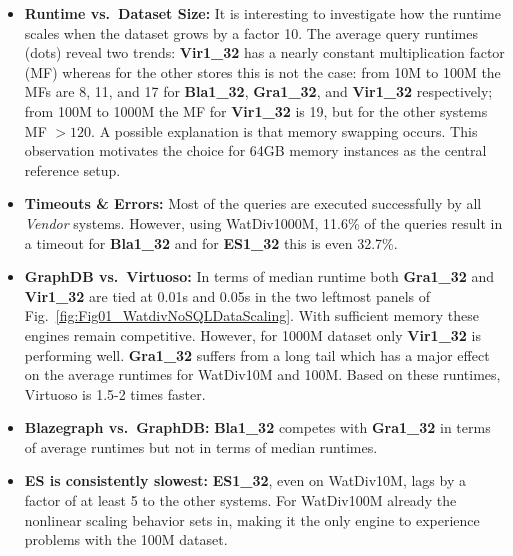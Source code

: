 \begin{itemize}
	\item \textbf{Runtime vs.\ Dataset Size:} It is interesting to investigate how the runtime scales when the dataset grows by a factor 10. The average query runtimes (dots) reveal two trends: \textbf{Vir1\_32} has a nearly constant multiplication factor (MF) whereas for the other stores this is not the case: from 10M to 100M the MFs are 8, 11, and 17 for \textbf{Bla1\_32}, \textbf{Gra1\_32}, and \textbf{Vir1\_32} respectively; from 100M to 1000M the MF for \textbf{Vir1\_32} is 19, but for the other systems MF $> 120$. A possible explanation is that memory swapping occurs. This observation motivates the choice for 64GB memory instances as the central reference setup.
\item \textbf{Timeouts \& Errors:} Most of the queries are executed successfully by all \emph{Vendor} systems. However, using WatDiv1000M, 11.6\% of the queries result in a timeout for \textbf{Bla1\_32}  and for \textbf{ES1\_32} this is even 32.7\%. 

\item \textbf{GraphDB vs.\ Virtuoso:} In terms of median runtime both \textbf{Gra1\_32} and \textbf{Vir1\_32} are tied at 0.01s and 0.05s in the two leftmost panels of Fig.~\ref{fig:Fig01_WatdivNoSQLDataScaling}. With sufficient memory these engines remain competitive. However, for 1000M dataset only \textbf{Vir1\_32} is performing well. %
\textbf{Gra1\_32} suffers from a long tail which has a major effect on the average runtimes for WatDiv10M and 100M. Based on these runtimes, Virtuoso is 1.5-2 times faster.

\item \textbf{Blazegraph vs.\ GraphDB:} \textbf{Bla1\_32} competes with \textbf{Gra1\_32} in terms of average runtimes but not in terms of median runtimes.

\item \textbf{ES is consistently slowest:} \textbf{ES1\_32}, even on WatDiv10M, lags by a factor of at least 5 to the other systems. For WatDiv100M already the nonlinear scaling behavior sets in, making it the only engine to experience problems with the 100M dataset. 
\end{itemize}
%
